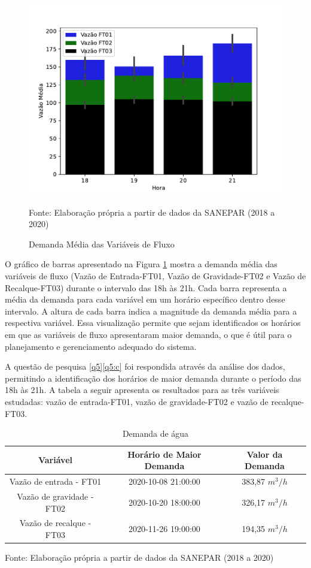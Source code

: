 \begin{figure}[htp!]
	\centering
	\caption{Demanda Média das Variáveis de Fluxo}
	\includegraphics[width=0.9\linewidth]{Resultados/Figuras/grafico-barras-demanda}
	
	\label{fig:grafico-barras-demanda}
	
	Fonte: Elaboração própria a partir de dados da SANEPAR (2018 a 2020)
\end{figure}

O gráfico de barras apresentado na Figura \ref{fig:grafico-barras-demanda} mostra a demanda média das variáveis de fluxo (Vazão de Entrada-FT01, Vazão de Gravidade-FT02 e Vazão de Recalque-FT03) durante o intervalo das 18h às 21h. Cada barra representa a média da demanda para cada variável em um horário específico dentro desse intervalo. A altura de cada barra indica a magnitude da demanda média para a respectiva variável. Essa visualização permite que sejam identificados os horários em que as variáveis de fluxo apresentaram maior demanda, o que é útil para o planejamento e gerenciamento adequado do sistema.

A questão de pesquisa \ref{q5}\ref{q5:c} foi respondida através da análise dos dados, permitindo a identificação dos horários de maior demanda durante o período das 18h às 21h. A tabela a seguir apresenta os resultados para as três variáveis estudadas: vazão de entrada-FT01, vazão de gravidade-FT02 e vazão de recalque-FT03.

\begin{table}[htp!]
	\centering
	\caption{Demanda de água}\label{tb:dem}
	\begin{tabular}{@{}ccc@{}}
		\toprule
		\textbf{Variável}         & \textbf{Horário de Maior Demanda} & \textbf{Valor da Demanda} \\ \midrule
		Vazão de entrada - FT01   & 2020-10-08 21:00:00               & 383,87 $m^3/h$                   \\
		Vazão de gravidade - FT02 & 2020-10-20 18:00:00               & 326,17 $m^3/h$                    \\
		Vazão de recalque - FT03  & 2020-11-26 19:00:00               & 194,35 $m^3/h$                    \\ \bottomrule
	\end{tabular}
	
	
	Fonte: Elaboração própria a partir de dados da SANEPAR (2018 a 2020)
\end{table}

